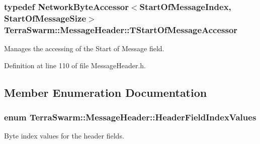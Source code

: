 \hypertarget{class_terra_swarm_1_1_message_header_a791ee152a9a2709c7479737dfdddfa2f}{
\subsubsection[{T\-Start\-Of\-Message\-Accessor}]{\setlength{\rightskip}{0pt plus 5cm}typedef {\bf Network\-Byte\-Accessor}$<${\bf Start\-Of\-Message\-Index}, {\bf Start\-Of\-Message\-Size}$>$ {\bf Terra\-Swarm\-::\-Message\-Header\-::\-T\-Start\-Of\-Message\-Accessor}\hspace{0.3cm}{\ttfamily [private]}}}\label{class_terra_swarm_1_1_message_header_a791ee152a9a2709c7479737dfdddfa2f}


Manages the accessing of the Start of Message field. 



Definition at line 110 of file Message\-Header.\-h.



\subsection{Member Enumeration Documentation}
\hypertarget{class_terra_swarm_1_1_message_header_a2a96f83a96cfee0465da982814cb372a}{
\subsubsection[{Header\-Field\-Index\-Values}]{\setlength{\rightskip}{0pt plus 5cm}enum {\bf Terra\-Swarm\-::\-Message\-Header\-::\-Header\-Field\-Index\-Values}\hspace{0.3cm}{\ttfamily [private]}}}\label{class_terra_swarm_1_1_message_header_a2a96f83a96cfee0465da982814cb372a}


Byte index values for the header fields. 

